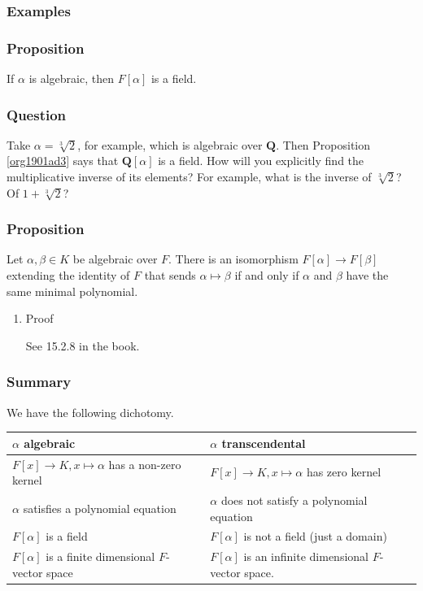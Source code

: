 \documentclass[11pt]{article}
\begin{document}
\subsubsection{Examples}
\label{sec:org626249e}
\subsubsection{Proposition}
\label{sec:org213499e}
\label{org1901ad3}
If \(\alpha\) is algebraic, then \(F[\alpha]\) is a field.
\subsubsection{Question}
\label{sec:org9810ef4}
Take \(\alpha = \sqrt[3]{2}\), for example, which is algebraic over \(\mathbf{Q}\).
Then Proposition \ref{org1901ad3} says that \(\mathbf{Q}[\alpha]\) is a field.
How will you explicitly find the multiplicative inverse of its elements?
For example, what is the inverse of \(\sqrt[3]{2}\)? Of \(1 + \sqrt[3]{2}\)?
\subsubsection{Proposition}
\label{sec:org4bec19e}

Let \(\alpha, \beta \in K\) be algebraic over \(F\).
There is an isomorphism \(F[\alpha] \to F[\beta]\) extending the identity of \(F\) that sends \(\alpha \mapsto \beta\) if and only if \(\alpha\) and \(\beta\) have the same minimal polynomial.
\begin{enumerate}
\item Proof
\label{sec:orgf9a9293}

See 15.2.8 in the book.
\end{enumerate}
\subsubsection{Summary}
\label{sec:org49fb43d}
We have the following dichotomy.
\begin{center}
\begin{tabular}{ll}
\hline
\(\alpha\) algebraic & \(\alpha\) transcendental\\
\hline
\(F[x] \to K, x \mapsto \alpha\) has a non-zero kernel & \(F[x] \to K, x \mapsto \alpha\) has zero kernel\\
\(\alpha\) satisfies a polynomial equation & \(\alpha\) does not satisfy a polynomial equation\\
\(F[\alpha]\) is a field & \(F[\alpha]\) is not a field (just a domain)\\
\(F[\alpha]\) is a finite dimensional \(F\)-vector space & \(F[\alpha]\) is an infinite dimensional \(F\)-vector space.\\
\hline
\end{tabular}
\end{center}
\end{document}
